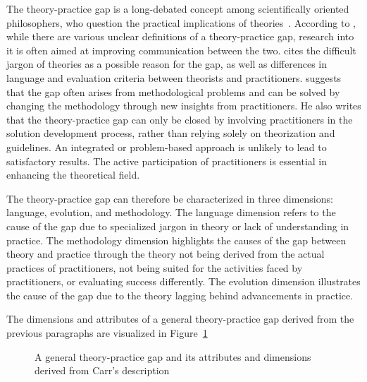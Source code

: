 The theory-practice gap is a long-debated concept among scientifically oriented philosophers, who question the practical implications of theories~\cite[p.~61]{Carr1980TGb}. According to , while there are various unclear definitions of a theory-practice gap, research into it is often aimed at improving communication between the two.  cites the difficult jargon of theories as a possible reason for the gap, as well as differences in language and evaluation criteria between theorists and practitioners.  suggests that the gap often arises from methodological problems and can be solved by changing the \gls{methodology} through new insights from practitioners. He also writes that the theory-practice gap can only be closed by involving practitioners in the solution development process, rather than relying solely on theorization and \glspl{guideline}. An integrated or problem-based approach is unlikely to lead to satisfactory results. The active participation of practitioners is essential in enhancing the theoretical field.~\cite[p.~67]{Carr1980TGb}

The theory-practice gap can therefore be characterized in three dimensions: language, evolution, and \gls{methodology}. The language dimension refers to the cause of the gap due to specialized jargon in theory or lack of understanding in practice. The \gls{methodology} dimension highlights the causes of the gap between theory and practice through the theory not being derived from the actual practices of practitioners, not being suited for the activities faced by practitioners, or evaluating success differently. The evolution dimension illustrates the cause of the gap due to the theory lagging behind advancements in practice.

The dimensions and attributes of a general theory-practice gap derived from the previous paragraphs are visualized in Figure~\ref{fig:gap-attributes}

\begin{figure}[!ht]
	\begin{center}
        \caption{A general theory-practice gap and its attributes and dimensions derived from Carr's description}\label{fig:gap-attributes}
    \end{center}
\end{figure}

